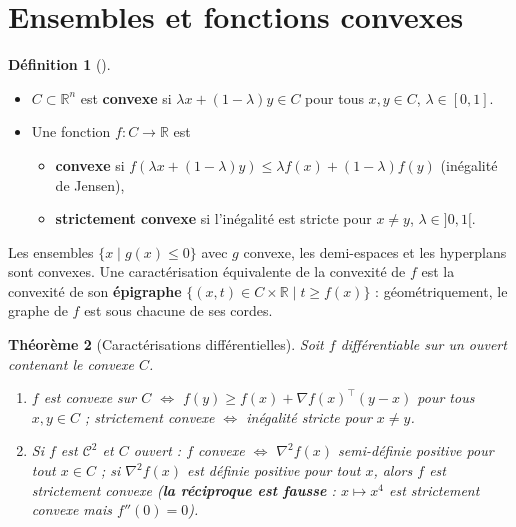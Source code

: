\documentclass[a4paper,11pt]{report}
\theoremstyle{plain}
\newtheorem{theorem}{Théorème}[]
\theoremstyle{definition}
\newtheorem{definition}[theorem]{Définition}
\theoremstyle{remark}
\newcommand{\R}{\mathbb{R}}
\newcommand{\grad}{\nabla}
\newcommand{\hess}{\nabla^2}
\newcommand{\T}{^{\!\top}}
\begin{document}
			\section{Ensembles et fonctions convexes}
			\begin{definition}[]\quad
				\begin{itemize}
					\item $C\subset\R^n$ est \textbf{convexe} si $\lambda x+(1-\lambda)y\in C$ pour tous $x,y\in C$, $\lambda\in[0,1]$. 
					\item Une fonction $f:C\to\R$ est 
					\begin{itemize}
						\item \textbf{convexe} si
						$f(\lambda x+(1-\lambda)y)\le\lambda f(x)+(1-\lambda)f(y)$ (inégalité de Jensen), 
						\item \textbf{strictement convexe} si l'inégalité est stricte pour $x\ne y$, $\lambda\in]0,1[$.
					\end{itemize}
				\end{itemize}
			\end{definition}
			Les ensembles $\{x\mid g(x)\le0\}$ avec $g$ convexe, les demi-espaces et les hyperplans sont convexes. Une caractérisation équivalente de la convexité de $f$ est la convexité de son \textbf{épigraphe} $\{(x,t)\in C\times\R\mid t\ge f(x)\}$ : géométriquement, le graphe de $f$ est sous chacune de ses cordes.
			\begin{theorem}[Caractérisations différentielles]\label{thm:conv}
				Soit $f$ différentiable sur un ouvert contenant le convexe $C$.
				\begin{enumerate}
					\item $f$ est convexe sur $C$ $\iff$ $f(y)\ge f(x)+\grad f(x)\T(y-x)$ pour tous $x,y\in C$ ; strictement convexe $\iff$ inégalité stricte pour $x\neq y$.
					\item Si $f$ est $\mathcal C^2$ et $C$ ouvert : $f$ convexe $\iff$ $\hess f(x)$ semi-définie positive pour tout $x\in C$ ; si $\hess f(x)$ est définie positive pour tout $x$, alors $f$ est strictement convexe (\textbf{la réciproque est fausse} : $x\mapsto x^4$ est strictement convexe mais $f''(0)=0$).
				\end{enumerate}
			\end{theorem}
\end{document}
